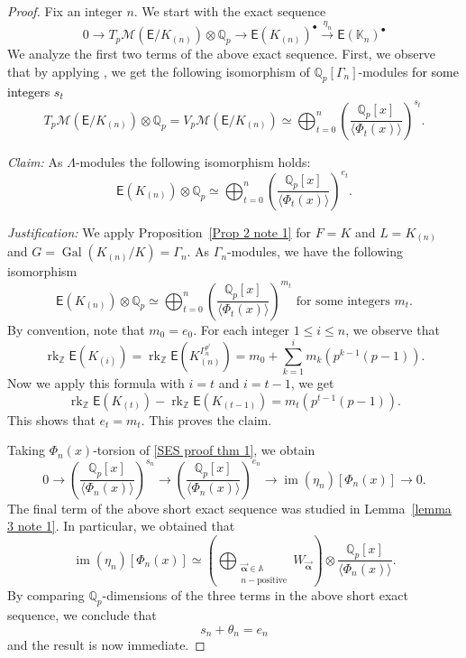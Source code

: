 \documentclass{amsart}
\newcommand{\edit}[1]{\textcolor{black}{#1}}
\numberwithin{equation}{section}
\theoremstyle{remark}
\newcommand{\val}{\vec{\boldsymbol{\alpha}}}
\newcommand{\rk}{\operatorname{rk}}
\newcommand{\EC}{\mathsf{E}}
\newcommand{\cM}{\mathcal{M}}
\newcommand{\Gal}{\operatorname{Gal}}
\newcommand{\Qp}{\mathbb{Q}_p}
\newcommand{\Kn}{\mathbb{K}_{n}}
\newcommand{\Z}{\mathbb{Z}}
\newcommand{\A}{\mathbb{A}}
\newcommand{\image}{\operatorname{im}}
\theoremstyle{plain} %
\begin{document}
\begin{proof}
Fix an integer $n$.
We start with the exact sequence
\begin{equation}
\label{SES proof thm 1}
0 \longrightarrow T_p\cM(\EC/K_{(n)}) \otimes \Qp \longrightarrow \EC(K_{(n)})^{\bullet} \xrightarrow{\eta_n} \EC(\Kn)^{\bullet}
\end{equation}
We analyze the first two terms of the above exact sequence.
First, we observe that by applying \cite[Corollary~3.8]{Lei23}, we get the following isomorphism of $\Qp[\Gamma_n]$-modules \edit{for some integers $s_t$}
\begin{equation}
\label{st}
T_p\cM(\EC/K_{(n)}) \otimes \Qp = V_p\cM(\EC/K_{(n)}) \simeq \bigoplus_{t= 0}^n \left( \frac{\Qp[x]}{\langle\Phi_{t}(x)\rangle}\right)^{s_t}.
\end{equation}

\noindent \emph{Claim:} As $\Lambda$-modules the following isomorphism holds:
\[
\EC(K_{(n)}) \otimes \Qp \simeq \bigoplus_{t=0}^n \left( \frac{\Qp[x]}{\langle\Phi_{t}(x)\rangle}\right)^{e_t}.
\]

\noindent \emph{Justification:} We apply Proposition~\ref{Prop 2 note 1} for $F=K$ and $L=K_{(n)}$ and $G =\Gal(K_{(n)}/K) = \Gamma_n$.
As $\Gamma_n$-modules, we have the following isomorphism 
\[
\EC(K_{(n)}) \otimes \Qp \simeq \bigoplus_{t=0}^n \left( \frac{\Qp[x]}{\langle\Phi_{t}(x)\rangle}\right)^{m_t} \text{ for some integers } m_t.
\]
By convention, note that $m_0 = e_0$.
For each integer $1\leq i \leq n$, we observe that
\[
\rk_{\Z}\EC(K_{(i)}) = \rk_{\Z}\EC(K_{(n)}^{\Gamma_n^{p^i}}) = m_0 + \sum_{k=1}^{i} m_k (p^{k-1}(p-1)).
\]
Now we apply this formula with $i=t$ and $i=t-1$, we get
\[
\rk_{\Z}\EC(K_{(t)}) - \rk_{\Z}\EC(K_{(t-1)}) = m_t(p^{t-1}(p-1)).
\]
This shows that $e_t = m_t$.
This proves the claim.

Taking $\Phi_n(x)$-torsion of \eqref{SES proof thm 1}, we obtain
\[
0 \longrightarrow \left( \frac{\Qp[x]}{\langle\Phi_{n}(x)\rangle}\right)^{s_n} \longrightarrow \left( \frac{\Qp[x]}{\langle\Phi_{n}(x)\rangle}\right)^{e_n} \longrightarrow \image(\eta_n)[\Phi_n(x)] \longrightarrow 0.
\]
The final term of the above short exact sequence was studied in Lemma~\ref{lemma 3 note 1}.
In particular, we obtained that
\[
\image(\eta_n)[\Phi_n(x)] \simeq \left( \bigoplus_{\substack{\val\in \A\\
n-\text{positive}}} W_{\val}\right) \otimes \frac{\Qp[x]}{\langle \Phi_n(x)\rangle}.
\]
By comparing $\Qp$-dimensions of the three terms in the above short exact sequence, we conclude that
\[
s_n + \theta_n= e_n
\]
and the result is now immediate.
\end{proof}
\end{document}

